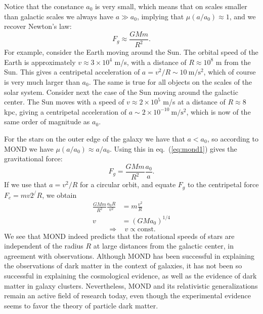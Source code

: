 \documentclass[11pt, a4paper,oneside,openright]{book}
\numberwithin{equation}{section}
\begin{document}
Notice that the constance $a_0$ is very small, which means that on scales smaller than galactic scales we always have $a\gg a_0$, implying that $\mu(a/a_0)\approx 1$, and we recover Newton's law:
\begin{equation}
F_g\approx \frac{GMm}{R^2}.
\end{equation}
For example, consider the Earth moving around the Sun. The orbital speed of the Earth is approximately $v\approx 3\times10^4$ m/s, with a distance of $R\approx 10^8$ m from the Sun. This gives a centripetal acceleration of $a=v^2/R\sim 10~\mathrm{m/s^2}$, which of course is very much larger than $a_0$. The same is true for all objects on the scales of the solar system. Consider next the case of the Sun moving around the galactic center. The Sun moves with a speed of $v\approx 2\times10^5$ m/s at a distance of $R\approx 8$ kpc, giving a centripetal acceleration of $a\sim 2\times10^{-10}~\mathrm{m/s^2}$, which is now of the same order of magnitude as $a_0$.

For the stars on the outer edge of the galaxy we have that $a<a_0$, so according to MOND we have $\mu(a/a_0)\approx a/a_0$. Using this in eq.\ (\ref{eq:mond1}) gives the gravitational force:
\begin{equation}
F_g = \frac{GMm}{R^2}\frac{a_0}{a}.
\end{equation}
If we use that $a=v^2/R$ for a circular orbit, and equate $F_g$ to the centripetal force $F_c=mv2^/R$, we obtain
\begin{equation}
\begin{split}
\frac{GMm}{R^2}\frac{a_0 R}{v^2}&= m\frac{v^2}{R}\\
v&=\left(GMa_0\right)^{1/4}
\end{split}
\end{equation}
\begin{equation}
\Rightarrow~~~~ v\propto \mathrm{const.}
\end{equation}
We see that MOND indeed predicts that the rotational speeds of stars are independent of the radius $R$ at large distances from the galactic center, in agreement with observations. Although MOND has been successful in explaining the observations of dark matter in the context of galaxies, it has not been so successful in explaining the cosmological evidence, as well as the evidence of dark matter in galaxy clusters. Nevertheless, MOND and its relativistic generalizations remain an active field of research today, even though the experimental evidence seems to favor the theory of particle dark matter.
\end{document}
